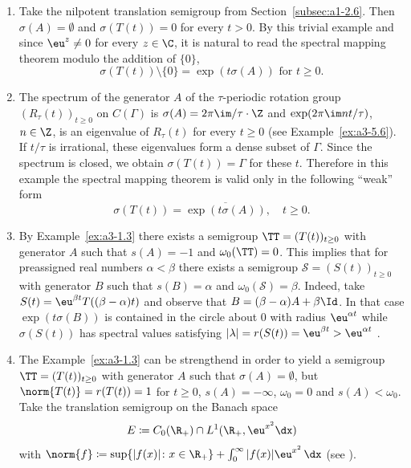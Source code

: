 \begin{example}\label{ex:a3-6.1}%
\begin{enumerate}[\upshape (i), wide, labelindent=.25em]

\item
{}
Take the nilpotent translation semigroup from Section~\ref{subsec:a1-2.6}. Then $\sigma(A) = \emptyset$ and $\sigma(T(t)) = 0$ for every $t > 0$.
By this trivial example and since $\eu^{z} \neq 0$ for every $z \in \C$, it is natural to read the spectral mapping theorem modulo the addition of\/ $\{0\}$, \ie 
\[
\sigma(T(t)) \setminus \{0\} = \exp(t\sigma(A))  \text{ for } t \geq 0 .
\]

\item
{}
The spectrum of the generator $A$ of the $\tau$-periodic rotation group $(R_{\tau}(t))_{t \geq 0}$ on $C(\Gamma)$ is $\sigma(A) = 2\pi\im /\tau\cdot\Z$ and $\exp(2\pi\im nt/\tau)$, $n \in \Z$, is an eigenvalue of\/ $R_{\tau}(t)$ for every $t \geq 0$ (see Example~\ref{ex:a3-5.6}).
If\/ $t/\tau$ is irrational, these eigenvalues form a dense subset of\/ $\Gamma$.
Since the spectrum is closed, we obtain $\sigma(T(t)) = \Gamma$ for these $t$.
Therefore in this example the spectral mapping theorem is valid only in the following \enquote{weak} form
\[
\sigma(T(t)) = \overline{\exp(t\sigma(A))}, \quad t \geq 0 .
\]

\item 
By Example~\ref{ex:a3-1.3} there exists a semigroup $\TT = (T(t))_{t \geq 0}$ with generator $A$ such that $s(A) = -1$ and $\omega_{0}(\TT) = 0$.
This implies that for preassigned real numbers $\alpha < \beta$ there exists a semigroup $\mathcal{S} = (S(t))_{t \geq 0}$ with generator $B$ such that $s(B) = \alpha$ and $\omega_{0}(\mathcal{S}) = \beta$. Indeed, take $S(t) = \eu^{\beta t}T((\beta - \alpha)t)$ and observe that $B = (\beta-\alpha)A + \beta\Id$. 
In that case $\exp(t\sigma(B))$ is contained in the circle about $0$ with radius $\eu^{\alpha t}$ 
while $\sigma(S(t))$ has spectral values satisfying $|\lambda| = r(S(t)) = \eu^{\beta t} > \eu^{\alpha t}$ .


\item 
The Example~\ref{ex:a3-1.3} can be strengthend in order to yield a semigroup $\TT = (T(t))_{t \geq 0}$ with generator $A$ such that $\sigma(A) = \emptyset$, but $\norm{T(t)} = r(T(t)) = 1$ for $t \geq 0$, \ie $s(A) = -\infty$, $\omega_{0} = 0$ and $s(A) < \omega_{0}$. 
Take the translation semigroup on the Banach space
\[
E \coloneqq C_{0}(\R_{+}) \cap L^{1}(\R_{+}, \eu^{x^{2}}\dx)
\]
with $\norm{f} \coloneqq \sup \{|f(x)| \colon x \in \R_{+}\} + \int_{0}^{\infty} |f(x)|\eu^{x^{2}} \, \dx$ (see \textcite{greinervoigtwolff:1981}).


\end{enumerate}
\end{example}

